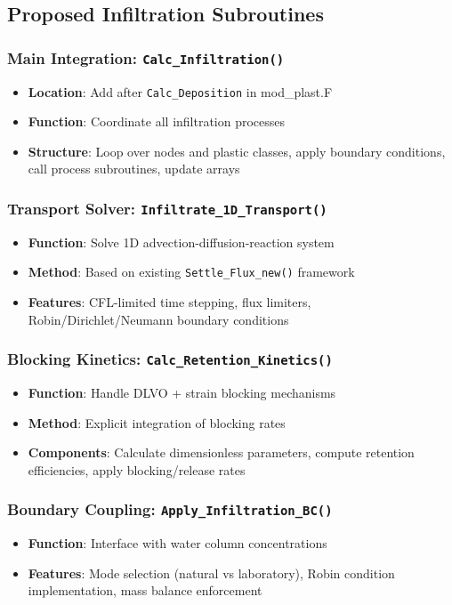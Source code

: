 \documentclass[11pt,a4paper]{article}
\begin{document}
\subsection{Proposed Infiltration Subroutines}

\subsubsection{Main Integration: \texttt{Calc\_Infiltration()}}
\begin{itemize}
    \item \textbf{Location}: Add after \texttt{Calc\_Deposition} in mod\_plast.F
    \item \textbf{Function}: Coordinate all infiltration processes
    \item \textbf{Structure}: Loop over nodes and plastic classes, apply boundary conditions, call process subroutines, update arrays
\end{itemize}

\subsubsection{Transport Solver: \texttt{Infiltrate\_1D\_Transport()}}
\begin{itemize}
    \item \textbf{Function}: Solve 1D advection-diffusion-reaction system
    \item \textbf{Method}: Based on existing \texttt{Settle\_Flux\_new()} framework
    \item \textbf{Features}: CFL-limited time stepping, flux limiters, Robin/Dirichlet/Neumann boundary conditions
\end{itemize}

\subsubsection{Blocking Kinetics: \texttt{Calc\_Retention\_Kinetics()}}
\begin{itemize}
    \item \textbf{Function}: Handle DLVO + strain blocking mechanisms
    \item \textbf{Method}: Explicit integration of blocking rates
    \item \textbf{Components}: Calculate dimensionless parameters, compute retention efficiencies, apply blocking/release rates
\end{itemize}

\subsubsection{Boundary Coupling: \texttt{Apply\_Infiltration\_BC()}}
\begin{itemize}
    \item \textbf{Function}: Interface with water column concentrations
    \item \textbf{Features}: Mode selection (natural vs laboratory), Robin condition implementation, mass balance enforcement
\end{itemize}
\end{document}
